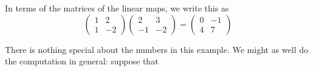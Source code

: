 \documentclass{article}
\begin{document}
In terms of the matrices of the linear maps, we write this as
\begin{equation}\label{moperation}
\begin{pmatrix}
1 & 2\\
1 & -2
\end{pmatrix}
\begin{pmatrix}
2 & 3\\
-1 & -2
\end{pmatrix}
=
\begin{pmatrix}
0 & -1\\
4 & 7
\end{pmatrix}
\end{equation}

There is nothing special about the numbers in this example. We might as well
do the computation in general: suppose that
\end{document}
